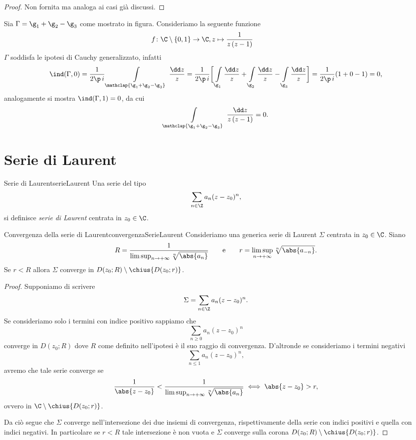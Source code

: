 \begin{proof}
	Non fornita ma analoga ai casi già discussi.
\end{proof}

\begin{ese}
	Sia \(\Gamma = \g_1+\g_2-\g_3\) come mostrato in figura. Consideriamo la seguente funzione
	\[
		f\colon \C\setminus\{0,1\} \to \C, z \mapsto \frac{1}{z\,(z-1)} \qquad\qquad 
	\]
	\(\Gamma\) soddisfa le ipotesi di Cauchy generalizzato, infatti
	\[
		\ind(\Gamma,0) = \frac{1}{2\p\,i} \int\limits_{\mathclap{\g_1+\g_2-\g_3}}\, \frac{\dd z}{z} = \frac{1}{2\p\,i} \bigg[ \int\limits_{\g_1}\frac{\dd z}{z} + \int\limits_{\g_2} \frac{\dd z}{z} - \int\limits_{\g_3}\frac{\dd z}{z}\bigg] = \frac{1}{2\p\,i}(1+0-1) = 0,
	\]
	analogamente si mostra \(\ind(\Gamma,1)=0\), da cui
	\[
		\int\limits_{\mathclap{\g_1+\g_2-\g_3}}\, \frac{\dd z}{z\,(z-1)} = 0.
	\]
\end{ese}
%
%
\section{Serie di Laurent}

\begin{defn}{Serie di Laurent}{serieLaurent}
	Una serie del tipo
	\[
		\sum_{n\in \Z}a_n(z-z_0)^n,
	\]
	si definisce \emph{serie di Laurent} centrata in \(z_0\in\C\).
\end{defn}

\begin{prop}{Convergenza della serie di Laurent}{convergenzaSerieLaurent}
	Consideriamo una generica serie di Laurent \(\Sigma\) centrata in \(z_0\in\C\).
	Siano
	\[
		R = \frac{1}{\limsup_{n\to +\infty}\sqrt[n]{\abs{a_n}}} \qquad\text{e}\qquad r = \limsup_{n\to +\infty}\sqrt[n]{\abs{a_{-n}}}.
	\]
	Se \(r<R\) allora \(\Sigma\) converge in \(D(z_0;R)\setminus\chius{D(z_0;r)}\).
\end{prop}

\begin{proof}
	Supponiamo di scrivere
	\[
		\Sigma = \sum_{n\in\Z}a_n (z-z_0)^n.
	\]
	Se consideriamo solo i termini con indice positivo sappiamo che
	\[
		\sum_{n\ge 0} a_n (z-z_0)^n
	\]
	converge in \(D(z_0;R)\) dove \(R\) come definito nell'ipotesi è il suo raggio di convergenza.
	D'altronde se consideriamo i termini negativi
	\[
		\sum_{n\le 1} a_n (z-z_0)^n,
	\]
	avremo che tale serie converge se
	\[
		\frac{1}{\abs{z-z_0}} < \frac{1}{\limsup_{n\to +\infty}\sqrt[n]{\abs{a_n}}} \iff \abs{z-z_0} > r,
	\]
	ovvero in \(\C\setminus \chius{D(z_0;r)}\).

	Da ciò segue che \(\Sigma\) converge nell'intersezione dei due insiemi di convergenza, rispettivamente della serie con indici positivi e quella con indici negativi.
	In particolare se \(r<R\) tale intersezione è non vuota e \(\Sigma\) converge sulla corona \(D(z_0;R)\setminus \chius{D(z_0;r)}\).
\end{proof}

